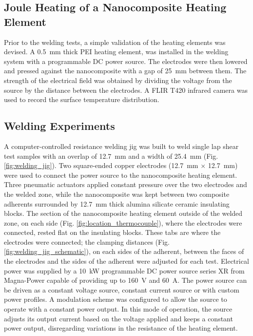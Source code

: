 \documentclass[11pt,review,times]{elsarticle}
\begin{document}
\subsection{Joule Heating of a Nanocomposite Heating Element}

Prior to the welding tests, a simple validation of the heating elements was devised. 
A \SI{0.5}{\milli\metre} thick PEI heating element, was installed in the welding system with a programmable DC power source. 
The electrodes were then lowered and pressed against the nanocomposite with a gap of \SI{25}{\mm} between them. 
The strength of the electrical field was obtained by dividing the voltage from the source by the distance between the electrodes. 
A FLIR T420 infrared camera was used to record the surface temperature distribution. 

\subsection{Welding Experiments}

A computer-controlled resistance welding jig was built to weld single lap shear test samples with an overlap of \SI{12.7}{\milli\metre} and a width of \SI{25.4}{\milli\metre} (Fig. \ref{fig:welding_jig}). 
Two square-ended copper electrodes (\SI{12.7}{\milli\metre} $\times$ \SI{12.7}{\milli\metre}) were used to connect the power source to the nanocomposite heating element. 
Three pneumatic actuators applied constant pressure over the two electrodes and the welded zone, while the nanocomposite was kept between two composite adherents surrounded by \SI{12.7}{\milli\metre} thick alumina silicate ceramic insulating blocks. 
The section of the nanocomposite heating element outside of the welded zone, on each side (Fig. \ref{fig:location_thermocouple}), where the electrodes were connected, rested flat on the insulating blocks. 
These tabs are where the electrodes were connected; the clamping distances (Fig. \ref{fig:welding_jig_schematic}), on each sides of the adherent, between the faces of the electrodes and the sides of the adherent were adjusted for each test. 
Electrical power was supplied by a \SI{10}{\kW} programmable DC power source series XR from Magna-Power capable of providing up to \SI{160}{\volt} and \SI{60}{\ampere}. 
The power source can be driven as a constant voltage source, constant current source or with custom power profiles. 
A modulation scheme was configured to allow the source to operate with a constant power output. 
In this mode of operation, the source adjusts its output current based on the voltage applied and keeps a constant power output, disregarding variations in the resistance of the heating element. 
\end{document}
